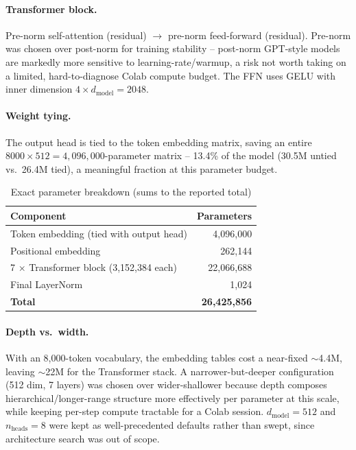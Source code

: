\documentclass[10pt,a4paper]{article}
\begin{document}
\paragraph{Transformer block.} Pre-norm self-attention (residual) $\to$
pre-norm feed-forward (residual). Pre-norm was chosen over post-norm for
training stability -- post-norm GPT-style models are markedly more sensitive
to learning-rate/warmup, a risk not worth taking on a limited,
hard-to-diagnose Colab compute budget. The FFN uses GELU with inner
dimension $4\times d_{\text{model}}=2048$.

\paragraph{Weight tying.} The output head is tied to the token embedding
matrix, saving an entire $8000\times512=4{,}096{,}000$-parameter matrix --
13.4\% of the model (30.5M untied vs.\ 26.4M tied), a meaningful fraction at
this parameter budget.

\begin{table}[H]\centering
\caption{Exact parameter breakdown (sums to the reported total)}
\label{tab:param-breakdown}
\small
\begin{tabular}{lr}\toprule
Component & Parameters\\\midrule
Token embedding (tied with output head) & 4,096,000\\
Positional embedding & 262,144\\
7 $\times$ Transformer block (3,152,384 each) & 22,066,688\\
Final LayerNorm & 1,024\\
\midrule
\textbf{Total} & \textbf{26,425,856}\\
\bottomrule\end{tabular}
\end{table}

\paragraph{Depth vs.\ width.} With an 8,000-token vocabulary, the embedding
tables cost a near-fixed $\sim$4.4M, leaving $\sim$22M for the Transformer
stack. A narrower-but-deeper configuration (512 dim, 7 layers) was chosen
over wider-shallower because depth composes hierarchical/longer-range
structure more effectively per parameter at this scale, while keeping
per-step compute tractable for a Colab session. $d_{\text{model}}=512$ and
$n_{\text{heads}}=8$ were kept as well-precedented defaults rather than
swept, since architecture search was out of scope.
\end{document}
